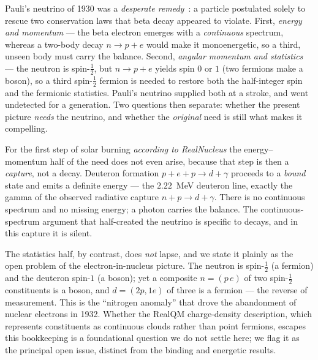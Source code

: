 \documentclass[11pt]{article}
\begin{document}
Pauli's neutrino of 1930 was a \emph{desperate remedy}~\cite{Pauli}: a particle postulated solely to
rescue two conservation laws that beta decay appeared to violate. First, \emph{energy and momentum} ---
the beta electron emerges with a \emph{continuous} spectrum, whereas a two-body decay $n\to p+e$ would
make it monoenergetic, so a third, unseen body must carry the balance. Second, \emph{angular momentum
and statistics} --- the neutron is spin-$\tfrac12$, but $n\to p+e$ yields spin $0$ or $1$ (two fermions
make a boson), so a third spin-$\tfrac12$ fermion is needed to restore both the half-integer spin and
the fermionic statistics. Pauli's neutrino supplied both at a stroke, and went undetected for a
generation. Two questions then separate: whether the present picture \emph{needs} the neutrino, and
whether the \emph{original} need is still what makes it compelling.

For the first step of solar burning \emph{according to RealNucleus} the energy--momentum half of the
need does not even arise, because that step is then a \emph{capture}, not a decay. Deuteron formation $p+e+p\to d+\gamma$ proceeds to a
\emph{bound} state and emits a definite energy --- the $2.22$~MeV deuteron line, exactly the gamma of
the observed radiative capture $n+p\to d+\gamma$. There is no continuous spectrum and no missing
energy; a photon carries the balance. The continuous-spectrum argument that half-created the neutrino
is specific to decays, and in this capture it is silent.

The statistics half, by contrast, does \emph{not} lapse, and we state it plainly as the open problem of
the electron-in-nucleus picture. The neutron is spin-$\tfrac12$ (a fermion) and the deuteron spin-$1$ (a
boson); yet a composite $n=(p\,e)$ of two spin-$\tfrac12$ constituents is a boson, and $d=(2p,1e)$ of
three is a fermion --- the reverse of measurement. This is the ``nitrogen anomaly'' that drove the
abandonment of nuclear electrons in 1932. Whether the RealQM charge-density description, which
represents constituents as continuous clouds rather than point fermions, escapes this bookkeeping is a
foundational question we do not settle here; we flag it as the principal open issue, distinct from the
binding and energetic results.
\end{document}
